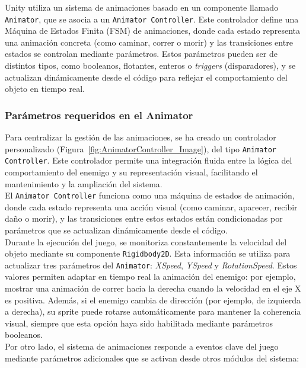 Unity utiliza un sistema de animaciones basado en un componente llamado \texttt{Animator}, que se asocia a un \texttt{Animator Controller}. Este controlador define una Máquina de Estados Finita (FSM) de animaciones, donde cada estado representa una animación concreta (como caminar, correr o morir) y las transiciones entre estados se controlan mediante parámetros. Estos parámetros pueden ser de distintos tipos, como booleanos, flotantes, enteros o \textit{triggers} (disparadores), y se actualizan dinámicamente desde el código para reflejar el comportamiento del objeto en tiempo real.\\

\subsubsection{Parámetros requeridos en el Animator}

Para centralizar la gestión de las animaciones, se ha creado un controlador personalizado (Figura~\ref{fig:AnimatorController_Image}), del tipo \texttt{Animator Controller}. Este controlador permite una integración fluida entre la lógica del comportamiento del enemigo y su representación visual, facilitando el mantenimiento y la ampliación del sistema.\\

El \texttt{Animator Controller} funciona como una máquina de estados de animación, donde cada estado representa una acción visual (como caminar, aparecer, recibir daño o morir), y las transiciones entre estos estados están condicionadas por parámetros que se actualizan dinámicamente desde el código.\\

Durante la ejecución del juego, se monitoriza constantemente la velocidad del objeto mediante su componente \texttt{Rigidbody2D}. Esta información se utiliza para actualizar tres parámetros del \texttt{Animator}: \textit{XSpeed}, \textit{YSpeed} y \textit{RotationSpeed}. Estos valores permiten adaptar en tiempo real la animación del enemigo: por ejemplo, mostrar una animación de correr hacia la derecha cuando la velocidad en el eje X es positiva. Además, si el enemigo cambia de dirección (por ejemplo, de izquierda a derecha), su sprite puede rotarse automáticamente para mantener la coherencia visual, siempre que esta opción haya sido habilitada mediante parámetros booleanos.\\

Por otro lado, el sistema de animaciones responde a eventos clave del juego mediante parámetros adicionales que se activan desde otros módulos del sistema:

